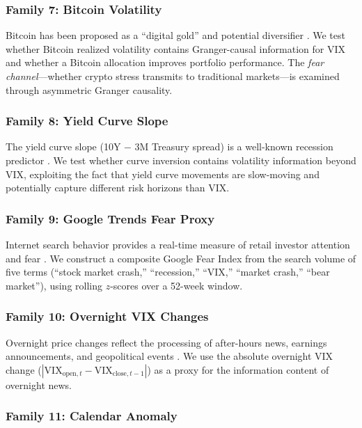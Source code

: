 \documentclass[12pt,a4paper]{article}
\begin{document}
\subsubsection{Family 7: Bitcoin Volatility}

Bitcoin has been proposed as a ``digital gold'' and potential diversifier \citep{bouri2017}. We test whether Bitcoin realized volatility contains Granger-causal information for VIX and whether a Bitcoin allocation improves portfolio performance. The \emph{fear channel}---whether crypto stress transmits to traditional markets---is examined through asymmetric Granger causality.

\subsubsection{Family 8: Yield Curve Slope}

The yield curve slope (10Y $-$ 3M Treasury spread) is a well-known recession predictor \citep{estrella1998}. We test whether curve inversion contains volatility information beyond VIX, exploiting the fact that yield curve movements are slow-moving and potentially capture different risk horizons than VIX.

\subsubsection{Family 9: Google Trends Fear Proxy}

Internet search behavior provides a real-time measure of retail investor attention and fear \citep{da2011, preis2013}. We construct a composite Google Fear Index from the search volume of five terms (``stock market crash,'' ``recession,'' ``VIX,'' ``market crash,'' ``bear market''), using rolling $z$-scores over a 52-week window.

\subsubsection{Family 10: Overnight VIX Changes}

Overnight price changes reflect the processing of after-hours news, earnings announcements, and geopolitical events \citep{lou2019}. We use the absolute overnight VIX change ($|\text{VIX}_{\text{open},t} - \text{VIX}_{\text{close},t-1}|$) as a proxy for the information content of overnight news.

\subsubsection{Family 11: Calendar Anomaly}
\end{document}
